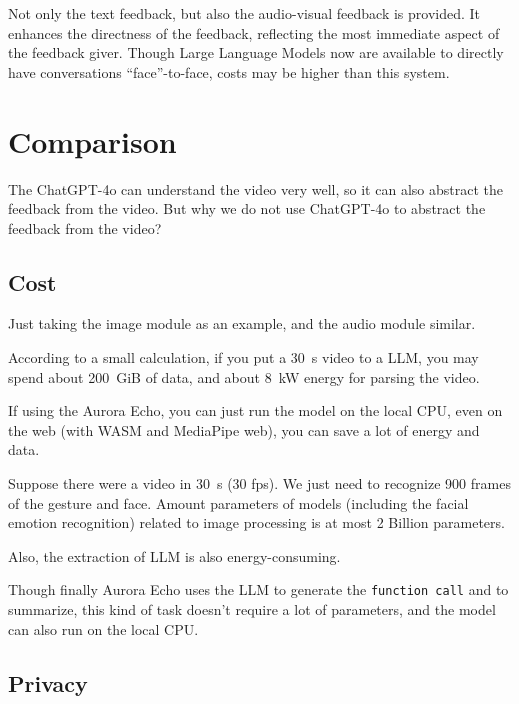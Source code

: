 \documentclass{article}
\begin{document}
    Not only the text feedback, but also the audio-visual feedback is provided.
    It enhances the directness of the feedback, reflecting the most immediate aspect of the feedback giver.
    Though Large Language Models now are available to directly have conversations ``face''-to-face, costs may be higher than this system.

    \section{Comparison}\label{sec:comparison}

    The ChatGPT-4o can understand the video very well, so it can also abstract the feedback from the video. \cite{tang2024videounderstandinglargelanguage}
    But why we do not use ChatGPT-4o to abstract the feedback from the video?

    \subsection{Cost}\label{subsec:cost}

    Just taking the image module as an example, and the audio module similar.

    According to a small calculation, if you put a \qty{30}{\second} video to a LLM, you may spend about \qty{200}{GiB} of data, and about \qty{8}{\kilo\watt} energy for parsing the video. \cite{husom2024pricepromptingprofilingenergy, samsi2023wordswattsbenchmarkingenergy}

    If using the Aurora Echo, you can just run the model on the local CPU, even on the web (with WASM and MediaPipe web), you can save a lot of energy and data.

    Suppose there were a video in \qty{30}{\second} (30 fps).
    We just need to recognize 900 frames of the gesture and face.
    Amount parameters of models (including the facial emotion recognition) related to image processing is at most 2 Billion parameters.

    Also, the extraction of LLM is also energy-consuming.

    Though finally Aurora Echo uses the LLM to generate the \texttt{function call} and to summarize, this kind of task doesn't require a lot of parameters, and the model can also run on the local CPU\@.

    \subsection{Privacy}\label{subsec:privacy}
\end{document}
